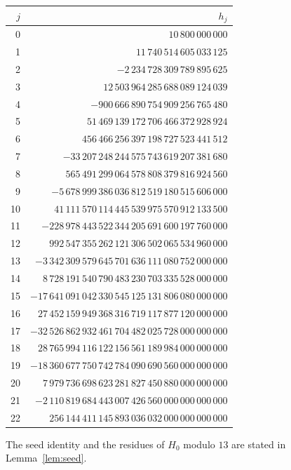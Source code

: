 \vspace{0.6\baselineskip}\noindent\begin{minipage}{\textwidth}
\begin{center}
\label{tab:seed-coefficients}
\begin{tabular}{@{}r r@{}}
\toprule
$j$ & $h_j$\\
\midrule
0 & $10\,800\,000\,000$\\
1 & $11\,740\,514\,605\,033\,125$\\
2 & $-2\,234\,728\,309\,789\,895\,625$\\
3 & $12\,503\,964\,285\,688\,089\,124\,039$\\
4 & $-900\,666\,890\,754\,909\,256\,765\,480$\\
5 & $51\,469\,139\,172\,706\,466\,372\,928\,924$\\
6 & $456\,466\,256\,397\,198\,727\,523\,441\,512$\\
7 & $-33\,207\,248\,244\,575\,743\,619\,207\,381\,680$\\
8 & $565\,491\,299\,064\,578\,808\,379\,816\,924\,560$\\
9 & $-5\,678\,999\,386\,036\,812\,519\,180\,515\,606\,000$\\
10 & $41\,111\,570\,114\,445\,539\,975\,570\,912\,133\,500$\\
11 & $-228\,978\,443\,522\,344\,205\,691\,600\,197\,760\,000$\\
12 & $992\,547\,355\,262\,121\,306\,502\,065\,534\,960\,000$\\
13 & $-3\,342\,309\,579\,645\,701\,636\,111\,080\,752\,000\,000$\\
14 & $8\,728\,191\,540\,790\,483\,230\,703\,335\,528\,000\,000$\\
15 & $-17\,641\,091\,042\,330\,545\,125\,131\,806\,080\,000\,000$\\
16 & $27\,452\,159\,949\,368\,316\,719\,117\,877\,120\,000\,000$\\
17 & $-32\,526\,862\,932\,461\,704\,482\,025\,728\,000\,000\,000$\\
18 & $28\,765\,994\,116\,122\,156\,561\,189\,984\,000\,000\,000$\\
19 & $-18\,360\,677\,750\,742\,784\,090\,690\,560\,000\,000\,000$\\
20 & $7\,979\,736\,698\,623\,281\,827\,450\,880\,000\,000\,000$\\
21 & $-2\,110\,819\,684\,443\,007\,426\,560\,000\,000\,000\,000$\\
22 & $256\,144\,411\,145\,893\,036\,032\,000\,000\,000\,000$\\
\bottomrule
\end{tabular}
\end{center}
\end{minipage}
\normalsize

\vspace{1.2\baselineskip}\noindent The seed identity and the residues of $H_0$ modulo $13$ are stated in Lemma~\ref{lem:seed}.
